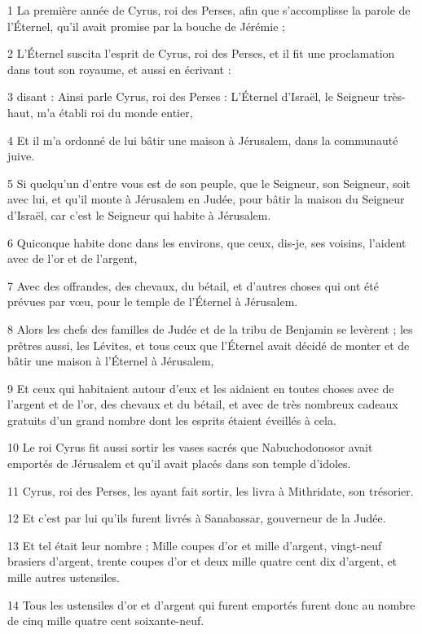 \par 1 La première année de Cyrus, roi des Perses, afin que s'accomplisse la parole de l'Éternel, qu'il avait promise par la bouche de Jérémie ;
\par 2 L'Éternel suscita l'esprit de Cyrus, roi des Perses, et il fit une proclamation dans tout son royaume, et aussi en écrivant :
\par 3 disant : Ainsi parle Cyrus, roi des Perses : L'Éternel d'Israël, le Seigneur très-haut, m'a établi roi du monde entier,
\par 4 Et il m'a ordonné de lui bâtir une maison à Jérusalem, dans la communauté juive.
\par 5 Si quelqu'un d'entre vous est de son peuple, que le Seigneur, son Seigneur, soit avec lui, et qu'il monte à Jérusalem en Judée, pour bâtir la maison du Seigneur d'Israël, car c'est le Seigneur qui habite à Jérusalem.
\par 6 Quiconque habite donc dans les environs, que ceux, dis-je, ses voisins, l'aident avec de l'or et de l'argent,
\par 7 Avec des offrandes, des chevaux, du bétail, et d'autres choses qui ont été prévues par vœu, pour le temple de l'Éternel à Jérusalem.
\par 8 Alors les chefs des familles de Judée et de la tribu de Benjamin se levèrent ; les prêtres aussi, les Lévites, et tous ceux que l'Éternel avait décidé de monter et de bâtir une maison à l'Éternel à Jérusalem,
\par 9 Et ceux qui habitaient autour d'eux et les aidaient en toutes choses avec de l'argent et de l'or, des chevaux et du bétail, et avec de très nombreux cadeaux gratuits d'un grand nombre dont les esprits étaient éveillés à cela.
\par 10 Le roi Cyrus fit aussi sortir les vases sacrés que Nabuchodonosor avait emportés de Jérusalem et qu'il avait placés dans son temple d'idoles.
\par 11 Cyrus, roi des Perses, les ayant fait sortir, les livra à Mithridate, son trésorier.
\par 12 Et c'est par lui qu'ils furent livrés à Sanabassar, gouverneur de la Judée.
\par 13 Et tel était leur nombre ; Mille coupes d'or et mille d'argent, vingt-neuf brasiers d'argent, trente coupes d'or et deux mille quatre cent dix d'argent, et mille autres ustensiles.
\par 14 Tous les ustensiles d'or et d'argent qui furent emportés furent donc au nombre de cinq mille quatre cent soixante-neuf.
